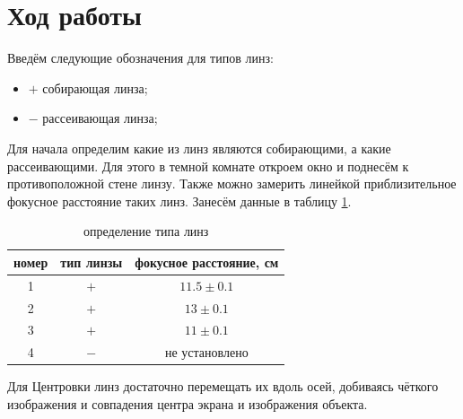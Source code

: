 \documentclass[a4paper,12pt]{article}
\begin{document}
\section*{Ход работы}


Введём следующие обозначения для типов линз:

\begin{itemize}
	\item $+$ собирающая линза;
	\item $-$ рассеивающая линза;
\end{itemize}

Для начала определим какие из линз являются собирающими, а какие рассеивающими. Для этого в темной комнате откроем окно и поднесём к противоположной стене линзу. Также можно замерить линейкой приблизительное фокусное расстояние таких линз. Занесём данные в таблицу \ref{tab:1}.     
\begin{table} [bhtp!] 
	\centering
	\begin{tabular}{|c|c|c|}\hline
		номер & тип линзы & фокусное расстояние, см      \\\hline
		1           & $+$   & $11.5\pm 0.1$                    \\\hline
		2           & $+$  & $13\pm 0.1$                       \\\hline
		3           & $+$   & $11\pm 0.1$                       \\\hline
		4           & $-$   & не установлено                       \\\hline
		
	\end{tabular}
	\caption{определение типа линз}
	\label{tab:1}
\end{table}

Для Центровки линз  достаточно перемещать их вдоль осей, добиваясь чёткого изображения и совпадения центра экрана и изображения объекта.
\end{document}
